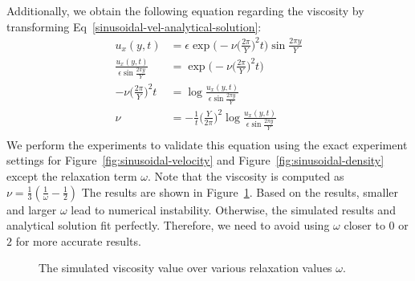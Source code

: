 Additionally, we obtain the following equation regarding the viscosity by
transforming Eq~\ref{sinusoidal-vel-analytical-solution}:
\begin{equation}
  \begin{aligned}
    u_x(y, t) & = \epsilon \exp
    \Biggl(
    -\nu
    \biggl(
      \frac{2\pi}{Y}
      \biggr)^2 t
    \Biggr) 
    \sin 
      \frac{2\pi y}{Y} \\
    \frac{u_x(y, t)}{
      \epsilon
      \sin  \frac{2\pi y}{Y}
    } & =  \exp
    \Biggl(
    -\nu
    \biggl(
      \frac{2\pi}{Y}
      \biggr)^2 t
    \Biggr) \\
    -\nu
    \biggl(
      \frac{2\pi}{Y}
      \biggr)^2 t
      &= 
    \log \frac{u_x(y, t)}{
      \epsilon
      \sin  \frac{2\pi y}{Y}
    } \\
    \nu
      &=
      - \frac{1}{t}
      \biggl(
        \frac{Y}{2\pi}
        \biggr)^2 
    \log \frac{u_x(y, t)}{
      \epsilon
      \sin  \frac{2\pi y}{Y}
    } \\
  \end{aligned}
\end{equation}
We perform the experiments to validate this equation using 
the exact experiment settings for Figure~\ref{fig:sinusoidal-velocity} and Figure~\ref{fig:sinusoidal-density}
except the relaxation term $\omega$.
Note that the viscosity is computed as $\nu = \frac{1}{3} (\frac{1}{\omega} - \frac{1}{2})$
The results are shown in Figure~\ref{fig:omega-vs-visc}.
Based on the results, smaller and larger $\omega$ lead to numerical instability.
Otherwise, the simulated results and analytical solution fit perfectly.
Therefore, we need to avoid using $\omega$ closer to $0$ or $2$ for more accurate results.

\begin{figure}[tb]
  \begin{center}
    \caption{The simulated viscosity value 
    over various relaxation values $\omega$.\label{fig:omega-vs-visc}}
  \end{center}
\end{figure}

